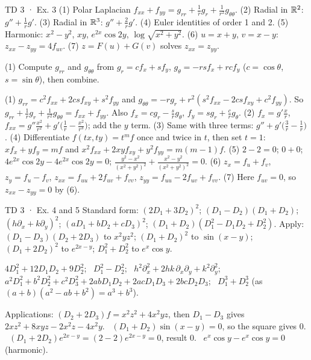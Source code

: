 \begin{problem}{TD 3 · Ex. 3}
(1) Polar Laplacian $f_{xx}+f_{yy}=g_{rr}+\frac1rg_r+\frac1{r^2}g_{\theta\theta}$. (2) Radial in
$\mathbb{R}^2$: $g''+\frac1rg'$. (3) Radial in $\mathbb{R}^3$: $g''+\frac2rg'$. (4) Euler identities of order 1
and 2. (5) Harmonic: $x^2-y^2$, $xy$, $e^{2x}\cos2y$, $\log\sqrt{x^2+y^2}$. (6) $u=x+y$, $v=x-y$:
$z_{xx}-z_{yy}=4f_{uv}$. (7) $z=F(u)+G(v)$ solves $z_{xx}=z_{yy}$.
\end{problem}
\begin{hint}(1) Compute $g_{rr}$ and $g_{\theta\theta}$ from $g_r=cf_x+sf_y$,
$g_\theta=-rsf_x+rcf_y$ ($c=\cos\theta$, $s=\sin\theta$), then combine.\end{hint}
\begin{solution}
(1) $g_{rr}=c^2f_{xx}+2csf_{xy}+s^2f_{yy}$ and $g_{\theta\theta}=-rg_r+r^2(s^2f_{xx}-2csf_{xy}+c^2f_{yy})$.
So $g_{rr}+\frac1rg_r+\frac1{r^2}g_{\theta\theta}=f_{xx}+f_{yy}$. Also $f_x=cg_r-\frac srg_\theta$,
$f_y=sg_r+\frac crg_\theta$.
(2) $f_x=g'\frac xr$, $f_{xx}=g''\frac{x^2}{r^2}+g'\big(\frac1r-\frac{x^2}{r^3}\big)$; add the $y$ term.
(3) Same with three terms: $g''+g'\big(\frac3r-\frac1r\big)$.
(4) Differentiate $f(tx,ty)=t^mf$ once and twice in $t$, then set $t=1$:
$xf_x+yf_y=mf$ and $x^2f_{xx}+2xyf_{xy}+y^2f_{yy}=m(m-1)f$.
(5) $2-2=0$; $0+0$; $4e^{2x}\cos2y-4e^{2x}\cos2y=0$; $\frac{y^2-x^2}{(x^2+y^2)^2}+\frac{x^2-y^2}{(x^2+y^2)^2}=0$.
(6) $z_x=f_u+f_v$, $z_y=f_u-f_v$, $z_{xx}=f_{uu}+2f_{uv}+f_{vv}$, $z_{yy}=f_{uu}-2f_{uv}+f_{vv}$.
(7) Here $f_{uv}=0$, so $z_{xx}-z_{yy}=0$ by (6).
\end{solution}

\begin{problem}{TD 3 · Ex. 4 and 5}
Standard form: $(2D_1+3D_2)^2$; $(D_1-D_2)(D_1+D_2)$; $(h\partial_x+k\partial_y)^2$;
$(aD_1+bD_2+cD_3)^2$; $(D_1+D_2)(D_1^2-D_1D_2+D_2^2)$. Apply: $(D_1-D_3)(D_2+2D_3)$ to
$x^2yz^2$; $(D_1+D_2)^2$ to $\sin(x-y)$; $(D_1+2D_2)^2$ to $e^{2x-y}$; $D_1^2+D_2^2$ to $e^x\cos y$.
\end{problem}
\begin{solution}
$4D_1^2+12D_1D_2+9D_2^2$; \ $D_1^2-D_2^2$; \ $h^2\partial_x^2+2hk\,\partial_x\partial_y+k^2\partial_y^2$;
\ $a^2D_1^2+b^2D_2^2+c^2D_3^2+2abD_1D_2+2acD_1D_3+2bcD_2D_3$; \ $D_1^3+D_2^3$ (as $(a+b)(a^2-ab+b^2)=a^3+b^3$).

Applications: $(D_2+2D_3)f=x^2z^2+4x^2yz$, then $D_1-D_3$ gives
$2xz^2+8xyz-2x^2z-4x^2y$. \ $(D_1+D_2)\sin(x-y)=0$, so the square gives $0$. \
$(D_1+2D_2)e^{2x-y}=(2-2)e^{2x-y}=0$, result $0$. \ $e^x\cos y-e^x\cos y=0$ (harmonic).
\end{solution}

